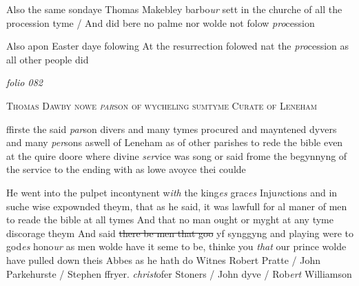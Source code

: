 \documentclass[12pt, a4paper]{book}
\begin{document}
		
				\marginpar[\vspace{0.5cm}{\textcolor{Gray}{Thomas makeblith ceremonies}}]{}
			
		
		\ifthenelse{\isodd{\thepage}}
		{\reversemarginpar}
		{\normalmarginpar}
		Also the same sondaye Thomas Makebley barbo\textit{ur} sett in the churche of all the procession tyme / And did
 bere no palme nor wolde not folow \textit{pro}cession
	
 
				\marginpar[\vspace{0.5cm}{\textcolor{Gray}{ceremonies}}]{}
			
		\ifthenelse{\isodd{\thepage}}
		{\reversemarginpar}
		{\normalmarginpar}
		Also apon Easter daye folowing At the resurrection
 folowed nat the \textit{pro}cession as all other people did


            
\dotfill
						\newpage
{}

\textit{folio 082}


            
            	
				\begin{center} \begin{large} {\scshape Thomas Dawby nowe \textit{par}son of wycheling
               	sumtyme Curate of Leneham} \end{large} \end{center}
			

 
 	
			
 	
				\marginpar[\vspace{0.5cm}{\textcolor{Gray}{seditious}}]{}
			
 	
		\ifthenelse{\isodd{\thepage}}
		{\reversemarginpar}
		{\normalmarginpar}
		 ffirste the said \textit{par}son divers and many tymes procured and
 		mayntened dyvers and many \textit{per}sons aswell of Leneham as of
  other parishes to rede the bible even at the quire doore where
 divine \textit{ser}vice was song or said frome the begynnyng of the
 service to the ending with as lowe avoyce thei coulde
 

	
				\marginpar[\vspace{0.5cm}{\textcolor{Gray}{seditious}}]{}
			
	
		\ifthenelse{\isodd{\thepage}}
		{\reversemarginpar}
		{\normalmarginpar}
		He went into the pulpet incontynent w\textit{ith} the king\textit{es} grac\textit{es} Inju\textit{n}ctions
 and in suche wise expownded theym, that as he said, it was
 lawfull for al maner of men to reade the bible at all tymes
 And that no man ought or myght at any tyme discorage theym
 And said \sout{there be men that goo} yf synggyng and playing were
 to god\textit{es} hono\textit{ur} as men wolde have it seme to be, thinke you \textit{that}
 our prince wolde have pulled down theis Abbes as he hath do
 Witnes Robert Pratte / John Parkehurste / Stephen
 	ffryer. \textit{christ}ofer Stoners / John dyve / Rob\textit{ert} Williamson
 
\end{document}
